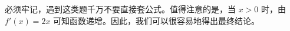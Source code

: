 \begin{solution}必须牢记，遇到这类题千万不要直接套公式。值得注意的是，当 $x>0$ 时，由 $f'(x)=2x$ 可知函数递增。因此，我们可以很容易地得出最终结论。\end{solution}
